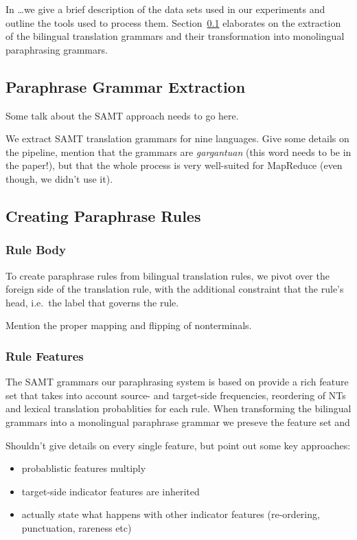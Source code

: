 \documentclass[11pt]{article}
\begin{document}
In \ldots we give a brief description of the
data sets used in our experiments and outline the tools used to
process them. Section~\ref{extraction} elaborates on the extraction
of the bilingual translation grammars and their transformation into
monolingual paraphrasing grammars.

\subsection{Paraphrase Grammar Extraction} \label{extraction}

Some talk about the SAMT approach needs to go here. 

We extract SAMT translation grammars for nine languages. Give some
details on the pipeline, mention that the grammars are
\emph{gargantuan} (this word needs to be in the paper!), but that the
whole process is very well-suited for MapReduce (even though, we
didn't use it).

\subsection{Creating Paraphrase Rules} \label{rule_creation}

\subsubsection{Rule Body} \label{rule_body}

To create paraphrase rules from bilingual translation rules, we pivot
over the foreign side of the translation rule, with the additional
constraint that the rule's head, i.e.\ the label that governs the
rule.

Mention the proper mapping and flipping of nonterminals.

\subsubsection{Rule Features} \label{rule_features}

The SAMT grammars our paraphrasing system is based on provide a rich
feature set that takes into account source- and target-side
frequencies, reordering of NTs and lexical translation probablities
for each rule. When transforming the bilingual grammars into a
monolingual paraphrase grammar we preseve the feature set and

Shouldn't give details on every single feature, but point out some key
approaches:
\begin{itemize}
\item probablistic features multiply 
\item target-side indicator features are inherited
\item actually state what happens with other indicator features
  (re-ordering, punctuation, rareness etc)
\end{itemize}
\end{document}
